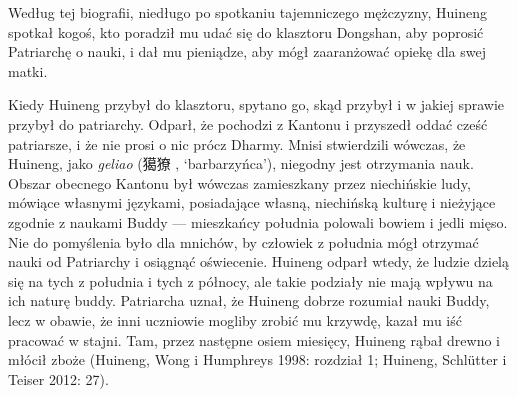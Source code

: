 Według tej biografii, niedługo po spotkaniu tajemniczego mężczyzny, Huineng spotkał kogoś, kto poradził mu udać się do klasztoru Dongshan, aby poprosić Patriarchę o nauki, i dał mu pieniądze, aby mógł zaaranżować opiekę dla swej matki.

Kiedy Huineng przybył do klasztoru, spytano go, skąd przybył i w jakiej sprawie przybył do patriarchy. Odparł, że pochodzi z Kantonu i przyszedł oddać cześć patriarsze, i że nie prosi o nic prócz Dharmy. Mnisi stwierdzili wówczas, że Huineng, jako \textit{geliao} (獦獠 , `barbarzyńca'), niegodny jest otrzymania nauk. Obszar obecnego Kantonu był wówczas zamieszkany przez niechińskie ludy, mówiące własnymi językami, posiadające własną, niechińską kulturę i nieżyjące zgodnie z naukami Buddy --- mieszkańcy południa polowali bowiem i jedli mięso. Nie do pomyślenia było dla mnichów, by człowiek z południa mógł otrzymać nauki od Patriarchy i osiągnąć oświecenie. Huineng odparł wtedy, że ludzie dzielą się na tych z południa i tych z północy, ale takie podziały nie mają wpływu na ich naturę buddy. Patriarcha uznał, że Huineng dobrze rozumiał nauki Buddy, lecz w obawie, że inni uczniowie mogliby zrobić mu krzywdę, kazał mu iść pracować w stajni. Tam, przez następne osiem miesięcy, Huineng rąbał drewno i młócił zboże (Huineng, Wong i Humphreys 1998: rozdział 1; Huineng, Schlütter i Teiser 2012: 27).

